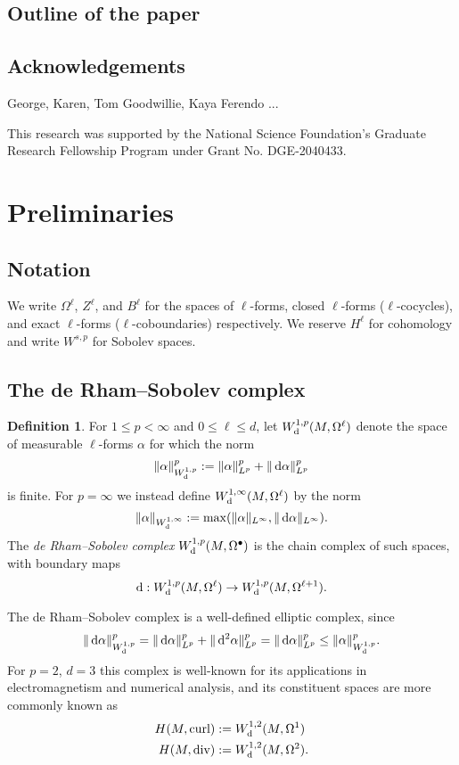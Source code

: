 \documentclass[reqno,11pt]{amsart}
\newcommand*\dif{\mathop{}\!\mathrm{d}}
\newcommand{\dfn}[1]{\emph{#1}\index{#1}}
\theoremstyle{definition}
\newtheorem{definition}[theorem]{Definition}
\numberwithin{equation}{section}
\begin{document}
\subsection{Outline of the paper}
 
\subsection{Acknowledgements}
George, Karen, Tom Goodwillie, Kaya Ferendo ...

This research was supported by the National Science Foundation's Graduate Research Fellowship Program under Grant No. DGE-2040433.

\section{Preliminaries}
\subsection{Notation}
We write $\Omega^\ell$, $Z^\ell$, and $B^\ell$ for the spaces of $\ell$-forms, closed $\ell$-forms ($\ell$-cocycles), and exact $\ell$-forms ($\ell$-coboundaries) respectively.
We reserve $H^\ell$ for cohomology and write $W^{s, p}$ for Sobolev spaces.

\subsection{The de Rham--Sobolev complex}
\begin{definition}
For $1 \leq p < \infty$ and $0 \leq \ell \leq d$, let $W^{1, p}_{\rm d}(M, \Omega^\ell)$ denote the space of measurable $\ell$-forms $\alpha$ for which the norm
$$\|\alpha\|_{W^{1, p}_{\rm d}}^p := \|\alpha\|_{L^p}^p + \|\dif \alpha\|_{L^p}^p$$
is finite.
For $p = \infty$ we instead define $W^{1, \infty}_{\rm d}(M, \Omega^\ell)$ by the norm 
$$\|\alpha\|_{W^{1, \infty}_{\rm d}} := \max(\|\alpha\|_{L^\infty}, \|\dif \alpha\|_{L^\infty}).$$
The \dfn{de Rham--Sobolev complex} $W^{1, p}_{\rm d}(M, \Omega^\bullet)$ is the chain complex of such spaces, with boundary maps 
$$\dif: W^{1, p}_{\rm d}(M, \Omega^\ell) \to W^{1, p}_{\rm d}(M, \Omega^{\ell + 1}).$$
\end{definition}

The de Rham--Sobolev complex is a well-defined elliptic complex, since 
$$\|\dif \alpha\|_{W^{1, p}_{\rm d}}^p = \|\dif \alpha\|_{L^p}^p + \|\dif^2 \alpha\|_{L^p}^p = \|\dif \alpha\|_{L^p}^p \leq \|\alpha\|_{W^{1, p}_{\rm d}}^p.$$
For $p = 2$, $d = 3$ this complex is well-known for its applications in electromagnetism and numerical analysis, and its constituent spaces are more commonly known as \cite[Chapter 2]{cessenat1996mathematical}
\begin{align*}
H(M, \text{curl}) &:= W^{1, 2}_{\rm d}(M, \Omega^1)\\
H(M, \text{div}) &:= W^{1, 2}_{\rm d}(M, \Omega^2).
\end{align*}
\end{document}
